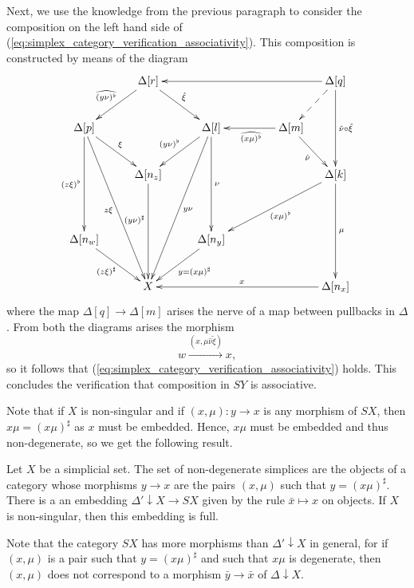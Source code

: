 Next, we use the knowledge from the previous paragraph to consider the composition on the left hand side of (\ref{eq:simplex_category_verification_associativity}). This composition is constructed by means of the diagram
\begin{displaymath}
\xymatrix@=1em{
&& \Delta [r] \ar[lldd]_{\widehat{(y\nu )^\flat } } \ar[ddrr]^{\hat{\xi } } &&&&&& \Delta [q] \ar[llllll] \ar@{-->}[ldd] \ar[dddd]^{\hat{\nu } \circ \tilde{\xi } } \\
\\
\Delta [p] \ar[ddrr]^\xi \ar[ddddd]_{(z\xi )^\flat } \ar[dddddddrr]_{z\xi } &&&& \Delta [l] \ar[lldd]_{(y\nu )^\flat } \ar[ddddd]^\nu \ar[llddddddd]^{y\nu } &&& \Delta [m] \ar[lll]^{\widehat{(x\mu )^\flat }} \ar[ddr]_{\hat{\nu }} \\
\\
&& \Delta [n_z] \ar[ddddd]_(.4){(y\nu )^\sharp } &&&&&& \Delta [k] \ar[llllddd]^{(x\mu )^\flat } \ar[ddddd]^\mu \\
\\
\\
\Delta [n_w] \ar[ddrr]_{(z\xi )^\sharp } &&&& \Delta [n_y] \ar[lldd]^{y=(x\mu )^\sharp } \\
\\
&& X &&&&&& \Delta [n_x] \ar[llllll]_x
}
\end{displaymath}
where the map $\Delta [q]\to \Delta [m]$ arises the nerve of a map between pullbacks in $\Delta$. From both the diagrams arises the morphism
\[w\xrightarrow{(x,\mu \hat{\nu } \tilde{\xi } )} x,\]
so it follows that (\ref{eq:simplex_category_verification_associativity}) holds. This concludes the verification that composition in $SY$ is associative.

Note that if $X$ is non-singular and if $(x,\mu ):y\to x$ is any morphism of $SX$, then $x\mu =(x\mu )^\sharp$ as $x$ must be embedded. Hence, $x\mu$ must be embedded and thus non-degenerate, so we get the following result.
\begin{lemma}
Let $X$ be a simplicial set. The set of non-degenerate simplices are the objects of a category whose morphisms $y\to x$ are the pairs $(x,\mu )$ such that $y=(x\mu )^\sharp$. There is a an embedding $\Delta '\downarrow X\to SX$ given by the rule $\bar{x}\mapsto x$ on objects. If $X$ is non-singular, then this embedding is full.
\end{lemma}
\noindent Note that the category $SX$ has more morphisms than $\Delta '\downarrow X$ in general, for if $(x,\mu )$ is a pair such that $y=(x\mu )^\sharp$ and such that $x\mu$ is degenerate, then $(x,\mu )$ does not correspond to a morphism $\bar{y} \to \bar{x}$ of $\Delta \downarrow X$.

